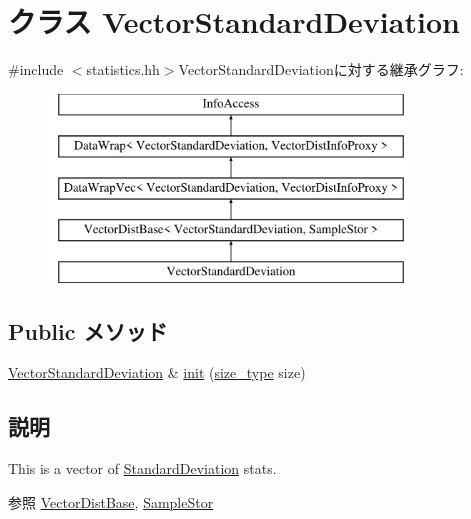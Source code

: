 \hypertarget{classStats_1_1VectorStandardDeviation}{
\section{クラス VectorStandardDeviation}
\label{classStats_1_1VectorStandardDeviation}
}


{\ttfamily \#include $<$statistics.hh$>$}VectorStandardDeviationに対する継承グラフ:\begin{figure}[H]
\begin{center}
\leavevmode
\includegraphics[height=5cm]{classStats_1_1VectorStandardDeviation}
\end{center}
\end{figure}
\subsection*{Public メソッド}
\begin{DoxyCompactItemize}
\item 
\hyperlink{classStats_1_1VectorStandardDeviation}{VectorStandardDeviation} \& \hyperlink{classStats_1_1VectorStandardDeviation_a23d45b8c43c8a8387cff800fd35492d9}{init} (\hyperlink{namespaceStats_ada51e68d31936547d3729c82daf6b7c6}{size\_\-type} size)
\end{DoxyCompactItemize}


\subsection{説明}
This is a vector of \hyperlink{classStats_1_1StandardDeviation}{StandardDeviation} stats. \begin{DoxySeeAlso}{参照}
\hyperlink{classStats_1_1VectorDistBase}{VectorDistBase}, \hyperlink{classStats_1_1SampleStor}{SampleStor} 
\end{DoxySeeAlso}


